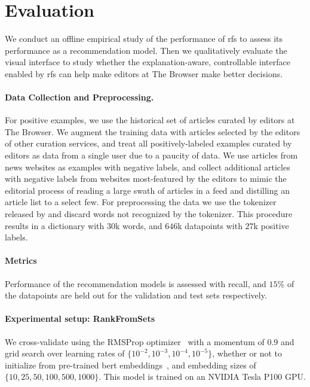 \section{Evaluation}
\label{sec:experiments}

We conduct an offline empirical study of the performance of \acrlong{rfs} to assess its performance as a recommendation model. Then we qualitatively evaluate the visual interface to study whether the explanation-aware, controllable interface enabled by \gls{rfs} can help make editors at The Browser make better decisions.

\paragraph{Data Collection and Preprocessing.} For positive examples, we use the historical set of articles curated by editors at The Browser. We augment the training data with articles selected by the editors of other curation services, and treat all positively-labeled examples curated by editors as data from a single user due to a paucity of data. We use articles from news websites as examples with negative labels, and collect additional articles with negative labels from websites most-featured by the editors to mimic the editorial process of reading a large swath of articles in a feed and distilling an article list to a select few. For preprocessing the data we use the tokenizer released by \citet{devlin2019bert:} and discard words not recognized by the tokenizer. This procedure results in a dictionary with $30$k words, and $646$k datapoints with $27$k positive labels.

\paragraph{Metrics} Performance of the recommendation models is assessed with recall, and $15\%$ of the datapoints are held out for the validation and test sets respectively.

\paragraph{Experimental setup: RankFromSets} We cross-validate using the RMSProp optimizer~\citep{tieleman2012lecture} with a momentum of $0.9$ and grid search over learning rates of $\{10^{-2}, 10^{-3}, 10^{-4}, 10^{-5}\}$, whether or not to initialize from pre-trained \acrshort{bert} embeddings~\citep{wolf2019huggingfaces}, and embedding sizes of $\{10,25,50, 100, 500, 1000\}$. This model is trained on an NVIDIA Tesla P100 GPU.

